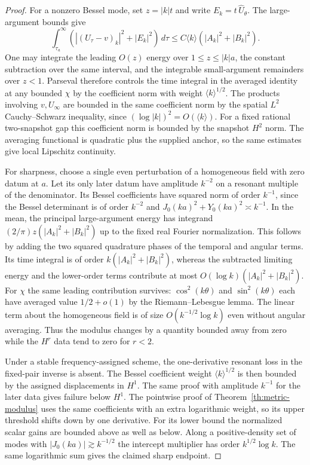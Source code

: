 \begin{proof}
For a nonzero Bessel mode, set $z=|k|t$ and write
$E_k=t\,\widehat U_\theta$. The large-argument bounds
give
\[
 \int_{\tau_a}^\infty
      (|(U_\tau-v)_k|^2+|E_k|^2)\,d\tau
 \le C\langle k\rangle(|A_k|^2+|B_k|^2).
\]
One may integrate the leading $O(z)$ energy
over $1\le z\le |k|a$, the constant subtraction
over the same interval, and the integrable
small-argument remainders over $z<1$.
Parseval therefore controls the time integral in
the averaged identity at any bounded $\chi$
by the coefficient norm with weight
$\langle k\rangle^{1/2}$.
The products involving $v,U_\infty$ are bounded
in the same coefficient norm by the spatial
$L^2$ Cauchy--Schwarz inequality, since
$(\log|k|)^2=O(\langle k\rangle)$.
For a fixed rational two-snapshot gap this
coefficient norm is bounded by the snapshot $H^2$
norm. The averaging functional is quadratic plus
the supplied anchor, so the same estimates give
local Lipschitz continuity.

For sharpness, choose a single even perturbation
of a homogeneous field with zero datum at $a$.
Let its only later datum have amplitude $k^{-2}$
on a resonant multiple of the denominator.
Its Bessel coefficients have squared norm
of order $k^{-1}$, since the Bessel determinant
is of order $k^{-2}$ and
$J_0(ka)^2+Y_0(ka)^2\asymp k^{-1}$.
In the mean, the principal large-argument
energy has integrand
$(2/\pi)z(|A_k|^2+|B_k|^2)$ up to the fixed
real Fourier normalization.
This follows by adding the two squared
quadrature phases of the temporal and angular
terms. Its time integral is of order
$k(|A_k|^2+|B_k|^2)$, whereas the subtracted
limiting energy and the lower-order terms
contribute at most
$O(\log k)(|A_k|^2+|B_k|^2)$.
For $\chi$ the same leading contribution
survives: $\cos^2(k\theta)$ and
$\sin^2(k\theta)$ each have averaged value
$1/2+o(1)$ by the Riemann--Lebesgue lemma.
The linear term about the homogeneous
field is of size
$O(k^{-1/2}\log k)$ even without angular
averaging. Thus the modulus changes by a
quantity bounded away from zero while the
$H^r$ data tend to zero for $r<2$.

Under a stable frequency-assigned scheme, the
one-derivative resonant loss in the fixed-pair
inverse is absent. The Bessel coefficient
weight $\langle k\rangle^{1/2}$ is then
bounded by the assigned displacements in $H^1$.
The same proof with amplitude $k^{-1}$ for the
later data gives failure below $H^1$.
The pointwise proof of
Theorem~\ref{th:metric-modulus} uses the same
coefficients with an extra logarithmic weight, so
its upper threshold shifts down by one derivative.
For its lower bound the normalized scalar gains
are bounded above as well as below. Along a
positive-density set of modes with
$|J_0(ka)|\gtrsim k^{-1/2}$ the intercept
multiplier has order $k^{1/2}\log k$.
The same logarithmic sum gives the claimed
sharp endpoint.
\end{proof}

